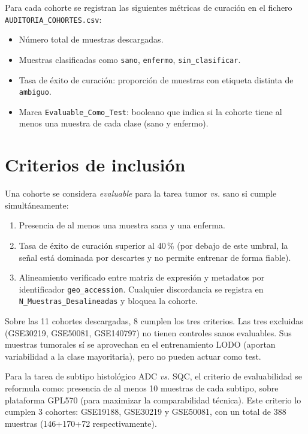 Para cada cohorte se registran las siguientes métricas de curación en el
fichero \texttt{AUDITORIA\_COHORTES.csv}:

\begin{itemize}
  \item Número total de muestras descargadas.
  \item Muestras clasificadas como \texttt{sano}, \texttt{enfermo},
  \texttt{sin\_clasificar}.
  \item Tasa de éxito de curación: proporción de muestras con etiqueta
  distinta de \texttt{ambiguo}.
  \item Marca \texttt{Evaluable\_Como\_Test}: booleano que indica si la
  cohorte tiene al menos una muestra de cada clase (sano y enfermo).
\end{itemize}

\section{Criterios de inclusión}
\label{sec:criterios_inclusion}

Una cohorte se considera \emph{evaluable} para la tarea tumor \emph{vs.}
sano si cumple simultáneamente:

\begin{enumerate}
  \item Presencia de al menos una muestra sana y una enferma.
  \item Tasa de éxito de curación superior al 40\,\% (por debajo de este
  umbral, la señal está dominada por descartes y no permite entrenar de
  forma fiable).
  \item Alineamiento verificado entre matriz de expresión y metadatos por
  identificador \texttt{geo\_accession}. Cualquier discordancia se
  registra en \texttt{N\_Muestras\_Desalineadas} y bloquea la cohorte.
\end{enumerate}

Sobre las 11 cohortes descargadas, 8 cumplen los tres criterios. Las tres
excluidas (GSE30219, GSE50081, GSE140797) no tienen controles sanos
evaluables. Sus muestras tumorales sí se aprovechan en el entrenamiento
LODO (aportan variabilidad a la clase mayoritaria), pero no pueden actuar
como test.

Para la tarea de subtipo histológico ADC \emph{vs.} SQC, el criterio de
evaluabilidad se reformula como: presencia de al menos 10 muestras de cada
subtipo, sobre plataforma GPL570 (para maximizar la comparabilidad técnica).
Este criterio lo cumplen 3 cohortes: GSE19188, GSE30219 y GSE50081, con
un total de 388 muestras (146+170+72 respectivamente).

